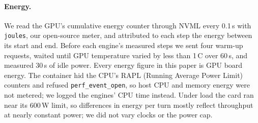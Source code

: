 \paragraph{Energy.} We read the GPU's cumulative energy counter through NVML every 0.1\,s with \texttt{joules}, our open-source
meter, and attributed to each step the energy between its start and end. Before each engine's measured steps we sent
four warm-up requests, waited until GPU temperature varied by less than 1\,\textdegree C over 60\,s, and measured 30\,s of
idle power. Every energy figure in this paper is GPU board energy. The container hid the CPU's RAPL (Running Average Power Limit) counters and refused
\texttt{perf\_event\_open}, so host CPU and memory energy were not metered; we logged the engines' CPU time instead. Under load the card ran near
its 600\,W limit, so differences in energy per turn mostly reflect throughput at nearly constant power; we did not vary
clocks or the power cap.

